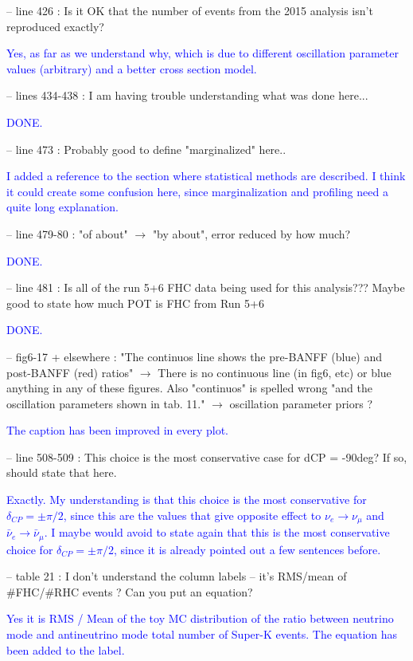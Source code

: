 \documentclass[final]{elsarticle}
\begin{document}
-- line 426 : Is it OK that the number of events from the 2015 analysis isn't
reproduced exactly?

\textcolor{blue}{Yes, as far as we understand why, which is due to different oscillation parameter values (arbitrary)
and a better cross section model.}


-- lines 434-438 : I am having trouble understanding what was done here...

\textcolor{blue}{DONE.}


-- line 473 : Probably good to define "marginalized" here..

\textcolor{blue}{I added a reference to the section where statistical methods are described. I think it could create some confusion here, since
marginalization and profiling need a quite long explanation.}


-- line 479-80 : "of about" $\rightarrow$ "by about", error reduced by how much?

\textcolor{blue}{DONE.}

-- line 481 : Is all of the run 5+6 FHC data being used for this analysis???
Maybe good to state how much POT is FHC from Run 5+6

\textcolor{blue}{DONE.}

-- fig6-17 + elsewhere : "The continuos line shows the pre-BANFF (blue) and
post-BANFF (red) ratios" $\rightarrow$ There is no continuous line (in fig6, etc) or blue
anything in any of these figures. Also "continuos" is spelled wrong "and the
oscillation parameters shown in tab. 11." $\rightarrow$ oscillation parameter priors ?

\textcolor{blue}{The caption has been improved in every plot. }

-- line 508-509 : This choice is the most conservative case for dCP = -90deg?
If so, should state that here.

\textcolor{blue}{Exactly. My understanding is that this choice is the most conservative for $\delta_{CP} = \pm \pi /2$,
since this are the values that give opposite effect to $\nu_e \rightarrow \nu_{\mu}$ and $\bar{\nu}_e \rightarrow \bar{\nu}_{\mu}$.
I maybe would avoid to state again that this is the most conservative choice for $\delta_{CP} = \pm \pi/2$,
since it is already pointed out a few sentences before. }

-- table 21 : I don't understand the column labels -- it's RMS/mean of
\#FHC/\#RHC events ?  Can you put an equation?

\textcolor{blue}{Yes it is RMS / Mean of the toy MC distribution of the ratio between neutrino mode and antineutrino mode total number of Super-K events. 
The equation has been added to the label.}
\end{document}

